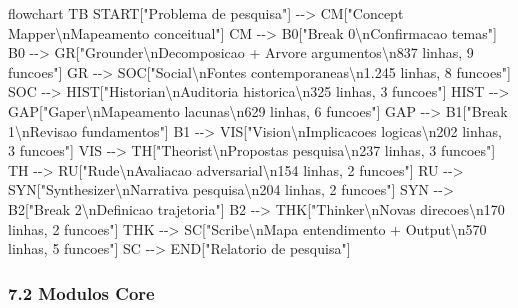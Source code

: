 \documentclass[
  12pt,
]{article}
\newenvironment{Shaded}{}{}
\newcommand{\NormalTok}[1]{#1}
\begin{document}
\begin{Shaded}
\begin{Highlighting}[]
\NormalTok{flowchart TB}
\NormalTok{START["Problema de pesquisa"] {-}{-}\textgreater{} CM["Concept Mapper\textbackslash{}nMapeamento conceitual"]}
\NormalTok{CM {-}{-}\textgreater{} B0["Break 0\textbackslash{}nConfirmacao temas"]}
\NormalTok{B0 {-}{-}\textgreater{} GR["Grounder\textbackslash{}nDecomposicao + Arvore argumentos\textbackslash{}n837 linhas, 9 funcoes"]}
\NormalTok{GR {-}{-}\textgreater{} SOC["Social\textbackslash{}nFontes contemporaneas\textbackslash{}n1.245 linhas, 8 funcoes"]}
\NormalTok{SOC {-}{-}\textgreater{} HIST["Historian\textbackslash{}nAuditoria historica\textbackslash{}n325 linhas, 3 funcoes"]}
\NormalTok{HIST {-}{-}\textgreater{} GAP["Gaper\textbackslash{}nMapeamento lacunas\textbackslash{}n629 linhas, 6 funcoes"]}
\NormalTok{GAP {-}{-}\textgreater{} B1["Break 1\textbackslash{}nRevisao fundamentos"]}
\NormalTok{B1 {-}{-}\textgreater{} VIS["Vision\textbackslash{}nImplicacoes logicas\textbackslash{}n202 linhas, 3 funcoes"]}
\NormalTok{VIS {-}{-}\textgreater{} TH["Theorist\textbackslash{}nPropostas pesquisa\textbackslash{}n237 linhas, 3 funcoes"]}
\NormalTok{TH {-}{-}\textgreater{} RU["Rude\textbackslash{}nAvaliacao adversarial\textbackslash{}n154 linhas, 2 funcoes"]}
\NormalTok{RU {-}{-}\textgreater{} SYN["Synthesizer\textbackslash{}nNarrativa pesquisa\textbackslash{}n204 linhas, 2 funcoes"]}
\NormalTok{SYN {-}{-}\textgreater{} B2["Break 2\textbackslash{}nDefinicao trajetoria"]}
\NormalTok{B2 {-}{-}\textgreater{} THK["Thinker\textbackslash{}nNovas direcoes\textbackslash{}n170 linhas, 2 funcoes"]}
\NormalTok{THK {-}{-}\textgreater{} SC["Scribe\textbackslash{}nMapa entendimento + Output\textbackslash{}n570 linhas, 5 funcoes"]}
\NormalTok{SC {-}{-}\textgreater{} END["Relatorio de pesquisa"]}
\end{Highlighting}
\end{Shaded}

\subsubsection{7.2 Modulos Core}\label{modulos-core}
\end{document}
